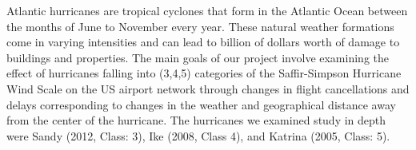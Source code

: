 
Atlantic hurricanes are tropical cyclones that form in the Atlantic Ocean between the months of June to November every year. These natural weather formations come in varying intensities and can lead to billion of dollars worth of damage to buildings and properties. The main goals of our project involve examining the effect of hurricanes falling into (3,4,5) categories of the Saffir-Simpson Hurricane Wind Scale on the US airport network through changes in flight cancellations and delays corresponding to changes in the weather and geographical distance away from the center of the hurricane. The hurricanes we examined study in depth were Sandy (2012, Class: 3), Ike (2008, Class 4), and Katrina (2005, Class: 5).   